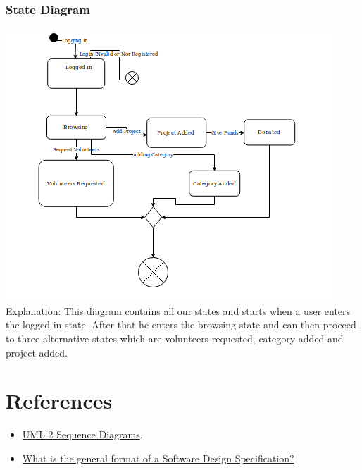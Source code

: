 \documentclass{scrreprt}
\begin{document}
\subsubsection{State Diagram}
\includegraphics[width=\textwidth]{images/state.png}
Explanation:
This diagram contains all our states and starts when a user enters the logged in state. After that he enters the browsing state and can then proceed to three alternative states which are volunteers requested, category added and project added.

\section{References}
\begin{itemize}
    \item \href{http://www.agilemodeling.com/artifacts/sequenceDiagram.htm}{UML 2 Sequence Diagrams}. 
    \item \href{https://softwareengineering.stackexchange.com/questions/205061/what-is-the-general-format-of-a-software-design-specification}{What is the general format of a Software Design Specification?}
\end{itemize}
\end{document}
